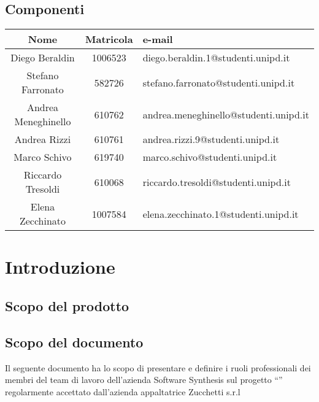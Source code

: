 \subsection{Componenti}
\begin{center}
\begin{tabularx}{0.9\textwidth}{c|c|l}
{\bf Nome}&{\bf Matricola}&{\bf e-mail}\\ 
\hline
\multirow{2}{*}{Diego Beraldin} & \multirow{2}{*}{1006523}&\multirow{2}{*}{diego.beraldin.1@studenti.unipd.it}\\&&\\
\multirow{2}{*}{Stefano Farronato} &\multirow{2}{*}{582726}&\multirow{2}{*}{stefano.farronato@studenti.unipd.it}\\&&\\
\multirow{2}{*}{Andrea Meneghinello} &\multirow{2}{*}{610762}&\multirow{2}{*}{andrea.meneghinello@studenti.unipd.it}\\&&\\
\multirow{2}{*}{Andrea Rizzi} &\multirow{2}{*}{610761}&\multirow{2}{*}{andrea.rizzi.9@studenti.unipd.it}\\&&\\
\multirow{2}{*}{Marco Schivo} &\multirow{2}{*}{619740}&\multirow{2}{*}{marco.schivo@studenti.unipd.it}\\&&\\
\multirow{2}{*}{Riccardo Tresoldi} &\multirow{2}{*}{610068}&\multirow{2}{*}{riccardo.tresoldi@studenti.unipd.it}\\&&\\
\multirow{2}{*}{Elena Zecchinato}&\multirow{2}{*}{1007584}&\multirow{2}{*}{elena.zecchinato.1@studenti.unipd.it}\\&&\\
\end{tabularx}
\end{center}

\clearpage
\section{Introduzione}
\subsection{Scopo del prodotto}
\purpose

\subsection{Scopo del documento}
Il seguente documento ha lo scopo di presentare e definire i ruoli professionali dei membri del team di lavoro dell'azienda Software Synthesis sul progetto ``\caName'' regolarmente accettato dall'azienda appaltatrice Zucchetti s.r.l


